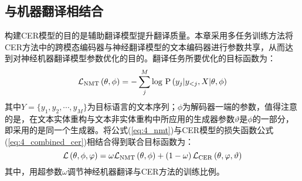 \subsection{与机器翻译相结合}
构建CER模型的目的是辅助翻译模型提升翻译质量。本章采用多任务训练方法将CER方法中的跨模态编码器与神经翻译模型的文本编码器进行参数共享，从而达到对神经机器翻译模型参数优化的目的。翻译任务所要优化的目标函数为：
\begin{equation}
\mathcal{L}_{\rm{NMT}} \left( \theta, \phi \right) =
    -\mathop{\sum}_j^M {\rm log}{\ }{\rm P} \left(y_j \vert y_{<j}, X \vert \theta, \phi \right)
\label{eq:4_nmt}
\end{equation}
其中$Y=\{y_1,y_2,\cdots,y_M\}$为目标语言的文本序列；$\phi$为解码器一端的参数，值得注意的是，在文本实体重构与文本非实体重构中所应用的生成器参数$\vartheta$是$\phi$的一部分，即采用的是同一个生成器。将公式(\ref{eq:4_nmt})与CER模型的损失函数公式(\ref{eq:4_combined_cer})相结合得到联合目标函数为：
\begin{equation}
\mathcal{L} \left( \theta, \phi, \varphi \right) = \omega\mathcal{L}_{\rm{NMT}} \left( \theta, \phi \right) + \left( 1-\omega \right) \mathcal{L}_{\rm{CER}} \left( \theta, \varphi, \vartheta \right)
\end{equation}
其中，用超参数$\omega$调节神经机器翻译与CER方法的训练比例。